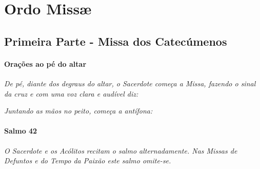 \section{Ordo Missæ}

\subsection{Primeira Parte - Missa dos Catecúmenos}

\paragraph{Orações ao pé do altar}

\textit{De pé, diante dos degraus do altar, o Sacerdote começa a Missa, fazendo o sinal da cruz e com uma voz clara e audível diz:}

\begin{paracol}{2}\switchcolumn{}\switchcolumn*{}\switchcolumn{}\end{paracol}

\textit{Juntando as mãos no peito, começa a antífona:}

\begin{paracol}{2}\switchcolumn{}\switchcolumn*{}\switchcolumn{}\end{paracol}

\paragraph{Salmo 42}

\textit{O Sacerdote e os Acólitos recitam o salmo alternadamente. Nas Missas de Defuntos e do Tempo da Paixão este salmo omite-se.}

